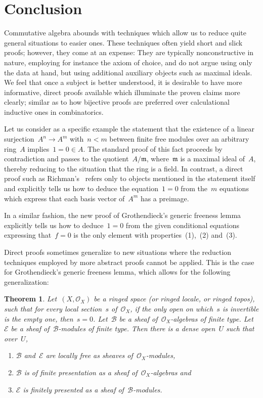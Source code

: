 \documentclass[oneside]{amsart}
\theoremstyle{definition}
\theoremstyle{plain}
\newtheorem{thm}[defn]{Theorem}
\theoremstyle{remark}
\newcommand{\mmm}{\mathfrak{m}}
\newcommand{\E}{\mathcal{E}}
\newcommand{\B}{\mathcal{B}}
\renewcommand{\O}{\mathcal{O}}
\begin{document}
\section{Conclusion}

Commutative algebra abounds with techniques which allow us to reduce quite
general situations to easier ones. These techniques often yield short and slick
proofs; however, they come at an expense: They are typically nonconstructive in
nature, employing for instance the axiom of choice, and do not argue using only
the data at hand, but using additional auxiliary objects such as maximal
ideals. We feel that once a subject is better understood, it is desirable to
have more informative, direct proofs available which illuminate the
proven claims more clearly; similar as to how bijective proofs are preferred over
calculational inductive ones in combinatorics.

Let us consider as a specific example the statement that the existence of a linear
surjection~$A^n \to A^m$ with~$n < m$ between finite free modules over an
arbitrary ring~$A$ implies~$1 = 0 \in A$. The standard proof of this fact proceeds
by contradiction and passes to the quotient~$A/\mmm$, where~$\mmm$ is a maximal
ideal of~$A$, thereby reducing to the situation that the ring is a field. In
contrast, a direct proof such as Richman's~\cite{richman:trivial-rings}
refers only to objects mentioned in the statement itself and
explicitly tells us how to deduce the equation~$1 = 0$ from the~$m$ equations
which express that each basis vector of~$A^m$ has a preimage.

In a similar fashion, the new proof of Grothendieck's generic freeness lemma
explicitly tells us how to deduce~$1 = 0$ from the given conditional
equations expressing that~$f = 0$ is the only element with properties~(1),~(2)
and~(3).

Direct proofs sometimes generalize to new situations where the reduction techniques
employed by more abstract proofs cannot be applied. This is the case for
Grothendieck's generic freeness lemma, which allows for the following
generalization:

\begin{thm}\label{thm:general-generic-freeness}
Let~$(X,\O_X)$ be a ringed space (or ringed locale, or ringed topos), such
that for every local section~$s$ of~$\O_X$, if the only open on which~$s$ is
invertible is the empty one, then~$s = 0$. Let~$\B$ be a sheaf
of~$\O_X$-algebras of finite type. Let~$\E$ be a sheaf of~$\B$-modules of finite type. Then there is a dense
open~$U$ such that over~$U$,
\begin{enumerate}
\item[(a)] $\B$ and~$\E$ are locally free as sheaves of~$\O_X$-modules,
\item[(b)] $\B$ is of finite presentation as a sheaf of~$\O_X$-algebras and
\item[(c)] $\E$ is finitely presented as a sheaf of~$\B$-modules.
\end{enumerate}
\end{thm}
\end{document}
